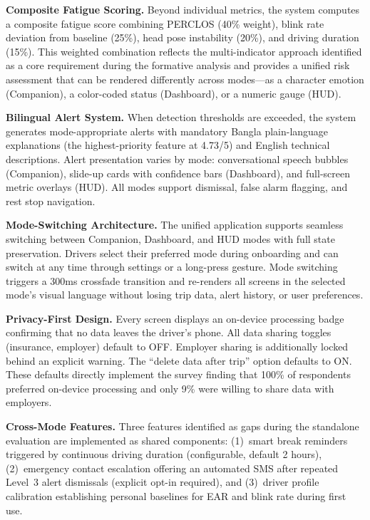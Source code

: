 \documentclass[sigconf]{acmart}
\begin{document}
\textbf{Composite Fatigue Scoring.} Beyond individual metrics, the system computes a composite fatigue score combining PERCLOS (40\% weight), blink rate deviation from baseline (25\%), head pose instability (20\%), and driving duration (15\%). This weighted combination reflects the multi-indicator approach identified as a core requirement during the formative analysis and provides a unified risk assessment that can be rendered differently across modes---as a character emotion (Companion), a color-coded status (Dashboard), or a numeric gauge (HUD).

\textbf{Bilingual Alert System.} When detection thresholds are exceeded, the system generates mode-appropriate alerts with mandatory Bangla plain-language explanations (the highest-priority feature at 4.73/5) and English technical descriptions. Alert presentation varies by mode: conversational speech bubbles (Companion), slide-up cards with confidence bars (Dashboard), and full-screen metric overlays (HUD). All modes support dismissal, false alarm flagging, and rest stop navigation.

\textbf{Mode-Switching Architecture.} The unified application supports seamless switching between Companion, Dashboard, and HUD modes with full state preservation. Drivers select their preferred mode during onboarding and can switch at any time through settings or a long-press gesture. Mode switching triggers a 300ms crossfade transition and re-renders all screens in the selected mode's visual language without losing trip data, alert history, or user preferences.

\textbf{Privacy-First Design.} Every screen displays an on-device processing badge confirming that no data leaves the driver's phone. All data sharing toggles (insurance, employer) default to OFF. Employer sharing is additionally locked behind an explicit warning. The ``delete data after trip'' option defaults to ON. These defaults directly implement the survey finding that 100\% of respondents preferred on-device processing and only 9\% were willing to share data with employers.

\textbf{Cross-Mode Features.} Three features identified as gaps during the standalone evaluation are implemented as shared components: (1)~smart break reminders triggered by continuous driving duration (configurable, default 2 hours), (2)~emergency contact escalation offering an automated SMS after repeated Level~3 alert dismissals (explicit opt-in required), and (3)~driver profile calibration establishing personal baselines for EAR and blink rate during first use.
\end{document}
